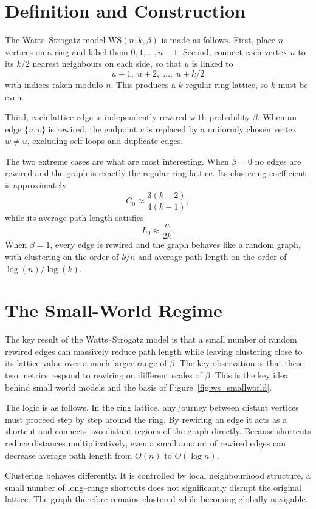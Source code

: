\documentclass[12pt, a4paper]{report}
\theoremstyle{definition}
\theoremstyle{plain}
\theoremstyle{remark}
\begin{document}
\section{Definition and Construction}
\label{sec:ws_def}

The Watts--Strogatz model $\mathrm{WS}(n,k,\beta)$ is made as
follows. First, place $n$ vertices on a ring and label
them $0,1,\dots,n-1$. Second, connect each vertex $u$ to its
$k/2$ nearest neighbours on each side, so that $u$ is linked
to
\[
u \pm 1,\; u \pm 2,\; \dots,\; u \pm k/2
\]
with indices taken modulo $n$. This produces a $k$-regular
ring lattice, so $k$ must be even.

Third, each lattice edge is independently rewired with
probability $\beta$. When an edge $\{u,v\}$ is rewired, the
endpoint $v$ is replaced by a uniformly chosen vertex
$w \neq u$, excluding self-loops and duplicate edges.

The two extreme cases are what are most interesting. When
$\beta=0$ no edges are rewired and the graph is exactly the
regular ring lattice. Its clustering coefficient is approximately
\[
C_0 \approx \frac{3(k-2)}{4(k-1)},
\]
while its average path length satisfies
\[
L_0 \approx \frac{n}{2k}.
\]
When $\beta=1$, every edge is rewired and the graph behaves
like a random graph, with clustering on the order
of $k/n$ and average path length on the order of
$\log(n)/\log(k)$.

\section{The Small-World Regime}
\label{sec:ws_smallworld}

The key result of the Watts--Strogatz model is that a small
number of random rewired edges can massively reduce path length
while leaving clustering close to its lattice value over a
much larger range of $\beta$. The key observation is that these
two metrics respond to rewiring on different scales of $\beta$. 
This is the key idea behind small world
models and the basis of Figure~\ref{fig:ws_smallworld}.

The logic is as follows. In the ring lattice, any
journey between distant vertices must proceed step by step
around the ring. By rewiring an edge it acts as a shortcut and
connects two distant regions of the graph directly. Because
shortcuts reduce distances multiplicatively, even a small
amount of rewired edges can decrease average path length
from $O(n)$ to $O(\log n)$.

Clustering behaves differently. It is controlled by local
neighbourhood structure, a small number of long--range
shortcuts does not significantly disrupt the original 
lattice. The graph therefore remains clustered while
becoming globally navigable.
\end{document}
